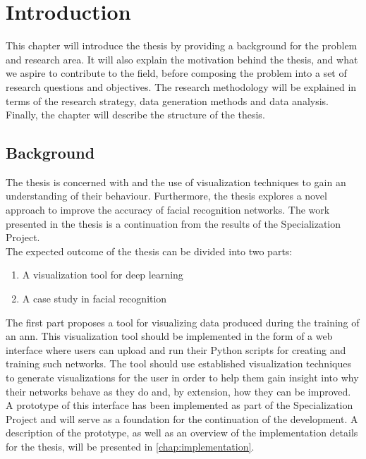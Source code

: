 \chapter{Introduction}

This chapter will introduce the thesis by providing a background for the problem and research area. It will also explain the motivation behind the thesis, and what we aspire to contribute to the field, before composing the problem into a set of research questions and objectives. The research methodology will be explained in terms of the research strategy, data generation methods and data analysis. Finally, the chapter will describe the structure of the thesis.

\section{Background}

\noindent The thesis is concerned with  and the use of visualization techniques to gain an understanding of their behaviour. Furthermore, the thesis explores a novel approach to improve the accuracy of facial recognition networks. The work presented in the thesis is a continuation from the results of the Specialization Project. \\

\noindent The expected outcome of the thesis can be divided into two parts:
\begin{enumerate}
    \item A visualization tool for deep learning
    \item A case study in facial recognition
\end{enumerate}

\noindent The first part proposes a tool for visualizing data produced during the training of an \acrshort{ann}. This visualization tool should be implemented in the form of a web interface where users can upload and run their Python scripts for creating and training such networks. The tool should use established visualization techniques to generate visualizations for the user in order to help them gain insight into why their networks behave as they do and, by extension, how they can be improved. A prototype of this interface has been implemented as part of the Specialization Project and will serve as a foundation for the continuation of the development. A description of the prototype, as well as an overview of the implementation details for the thesis, will be presented in \autoref{chap:implementation}. \\

